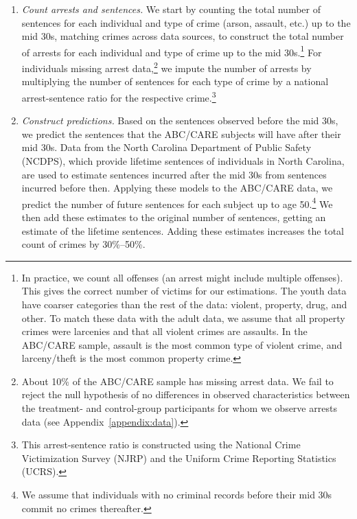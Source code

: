\begin{enumerate}
\item \textit{Count arrests and sentences.} We start by counting the total number of sentences for each individual and type of crime (arson, assault, etc.) up to the mid 30s, matching crimes across data sources, to construct the total number of  arrests for each individual and type of crime up to the mid 30s.\footnote{In practice, we count all offenses (an arrest might include multiple offenses). This gives the correct number of victims for our estimations. The youth data have coarser categories than the rest of the data: violent, property, drug, and other. To match these data with the adult data, we assume that all property crimes were larcenies and that all violent crimes are assaults. In the ABC/CARE sample, assault is the most common type of violent crime, and larceny/theft is the most common property crime.} For individuals missing arrest data,\footnote{About 10\% of the ABC/CARE sample has missing arrest data. We fail to reject the null hypothesis of no differences in observed characteristics between the treatment- and control-group participants for whom we observe arrests data (see  Appendix~\ref{appendix:data}).} we impute the number of arrests by multiplying the number of sentences for each type of crime by a national arrest-sentence ratio for the respective crime.\footnote{This arrest-sentence ratio is constructed using the National Crime Victimization Survey (NJRP) and the Uniform Crime Reporting Statistics (UCRS).}

\item \textit{Construct predictions.} Based on the sentences observed before the mid 30s, we predict the sentences that the ABC/CARE subjects will have after their mid 30s. Data from the North Carolina Department of Public Safety (NCDPS), which provide lifetime sentences of individuals in North Carolina, are used to estimate sentences incurred after the mid 30s from sentences incurred before then. Applying these models to the ABC/CARE data, we predict the number of future sentences for each subject up to age 50.\footnote{We assume that individuals with no criminal records before their mid 30s commit no crimes thereafter.} We then add these estimates to the original number of sentences, getting an estimate of the lifetime sentences. Adding these estimates increases the total count of crimes by 30\%--50\%.


\end{enumerate}
